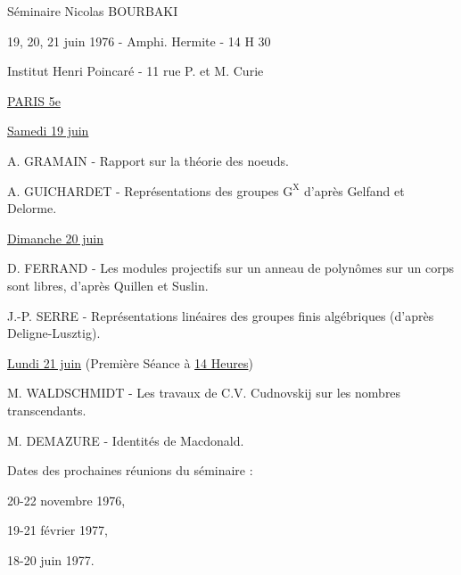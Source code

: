 Séminaire Nicolas BOURBAKI

19, 20, 21 juin 1976 - Amphi. Hermite - 14 H 30

Institut Henri Poincaré - 11 rue P. et M. Curie

\uline{PARIS 5e}

\uline{Samedi 19 juin}

A. GRAMAIN - Rapport sur la théorie des noeuds.

A. GUICHARDET - Représentations des groupes $\mathrm G^{\mathrm X}$ d'après Gelfand et Delorme.

\uline{Dimanche 20 juin}

D. FERRAND - Les modules projectifs sur un anneau de polynômes sur un corps sont libres, d'après Quillen et Suslin.

J.-P. SERRE - Représentations linéaires des groupes finis \textquotedbl{}algébriques\textquotedbl{} (d'après Deligne-Lusztig).

\uline{Lundi 21 juin} (Première Séance à \uline{14 Heures})

M. WALDSCHMIDT - Les travaux de C.V. \handwritten{\rlap{\v{\phantom{C}}}}Cudnovskij sur les nombres transcendants.

M. DEMAZURE - Identités de Macdonald.

Dates des prochaines réunions du séminaire :

20-22 novembre 1976,

19-21 février 1977,

18-20 juin 1977.


